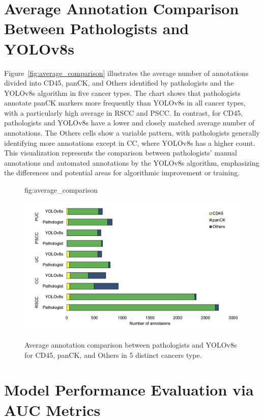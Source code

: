 \documentclass{midl} %
\begin{document}
\section{Average Annotation Comparison Between Pathologists and YOLOv8s}
\label{sec:average_comparison}

Figure~\ref{fig:average_comparison} illustrates the average number of annotations divided into CD45, panCK, and Others identified by pathologists and the YOLOv8s algorithm in five cancer types.
The chart shows that pathologists annotate panCK markers more frequently than YOLOv8s in all cancer types, with a particularly high average in RSCC and PSCC. In contrast, for CD45, pathologists and YOLOv8s have a lower and closely matched average number of annotations. The Others cells show a variable pattern, with pathologists generally identifying more annotations except in CC, where YOLOv8s has a higher count. This visualization represents the comparison between pathologists' manual annotations and automated annotations by the YOLOv8s algorithm, emphasizing the differences and potential areas for algorithmic improvement or training.

\begin{figure}[htbp]
\floatconts
  {fig:average_comparison}
  {\caption{Average annotation comparison between pathologists and YOLOv8s for CD45, panCK, and Others in 5 distinct cancers type.}}
  {\includegraphics[width=1\linewidth]{images/4.png}}
\end{figure}

\section{Model Performance Evaluation via AUC Metrics}
\label{sec:model_performance_evaluation}
\end{document}
